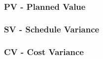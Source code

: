\subsubsection{PV - Planned Value}

\subsubsection{SV - Schedule Variance}

\subsubsection{CV - Cost Variance}

